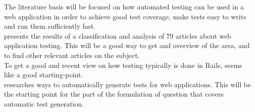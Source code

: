 
The literature basis will be focused on how automated testing can be used
in a web application in order to achieve good test coverage, make tests
easy to write and run them sufficiently fast.\\

\citet{article:mappingstudy} presents the results of a classification and
analysis of 79 articles about web application testing. This will be a
good way to get and overview of the area, and to find other relevant
articles on the subject.\\

To get a good and recent view on how testing typically is done in Rails,
\citet{web:rails-guide-testing} seems like a good starting-point.\\

\citet{article:test-generation-web} researches ways to automatically
generate tests for web applications. This will be the starting point for
the part of the formulation of question that covers automatic test
generation.
